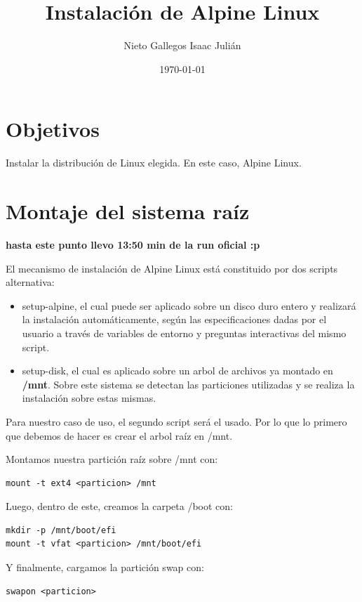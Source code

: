 \documentclass[11pt, letterpaper]{article}
\author{Nieto Gallegos Isaac Julián}
\date{\today}
\title{Instalación de Alpine Linux}
\begin{document}
\maketitle
\tableofcontents

\section{Objetivos}
\label{sec:org47e3e54}

Instalar la distribución de Linux elegida. En este caso, Alpine Linux.
\section{Montaje del sistema raíz}
\label{sec:org4b14959}

\textbf{hasta este punto llevo 13:50 min de la run oficial :p}

El mecanismo de instalación de Alpine Linux está constituido por dos scripts alternativa:

\begin{itemize}
\item setup-alpine, el cual puede ser aplicado sobre un disco duro entero y realizará la instalación automáticamente, según las especificaciones dadas por el usuario a través de variables de entorno y preguntas interactivas del mismo script.

\item setup-disk, el cual es aplicado sobre un arbol de archivos ya montado en \textbf{/mnt}. Sobre este sistema se detectan las particiones utilizadas y se realiza la instalación sobre estas mismas.
\end{itemize}

Para nuestro caso de uso, el segundo script será el usado. Por lo que lo primero que debemos de hacer es crear el arbol raíz en /mnt.

Montamos nuestra partición raíz sobre /mnt con:

\begin{verbatim}
mount -t ext4 <particion> /mnt
\end{verbatim}

Luego, dentro de este, creamos la carpeta /boot con:

\begin{verbatim}
mkdir -p /mnt/boot/efi
mount -t vfat <particion> /mnt/boot/efi
\end{verbatim}

Y finalmente, cargamos la partición swap con:

\begin{verbatim}
swapon <particion>
\end{verbatim}
\end{document}
